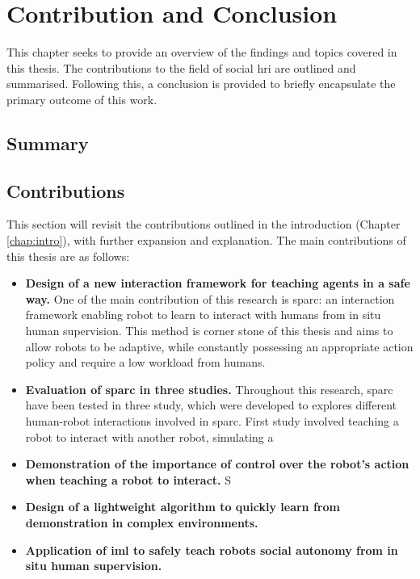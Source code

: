 \chapter{Contribution and Conclusion} \label{chap:conclusion}
This chapter seeks to provide an overview of the findings and topics covered in this thesis. The contributions to the field of social \gls{hri} are outlined and summarised. Following this, a conclusion is provided to briefly encapsulate the primary outcome of this work.

\section{Summary}\label{sec:conc_summary}

\section{Contributions}\label{sec:conc_contribution}
This section will revisit the contributions outlined in the introduction (Chapter \ref{chap:intro}), with further expansion and explanation. 
The main contributions of this thesis are as follows:
\begin{itemize}
	\item \textbf{Design of a new interaction framework for teaching agents in a safe way.} One of the main contribution of this research is \gls{sparc}: an interaction framework enabling robot to learn to interact with humans from in situ human supervision. This method is corner stone of this thesis and aims to allow robots to be adaptive, while constantly possessing an appropriate action policy and require a low workload from humans.
	
	\item \textbf{Evaluation of \gls{sparc} in three studies.} Throughout this research, \gls{sparc} have been tested in three study, which were developed to explores different human-robot interactions involved in \gls{sparc}. First study involved teaching a robot to interact with another robot, simulating a 
	
	\item \textbf{Demonstration of the importance of control over the robot's action when teaching a robot to interact.} S
	
	\item \textbf{Design of a lightweight algorithm to quickly learn from demonstration in complex environments.}
	
	\item \textbf{Application of \gls{iml} to safely teach robots social autonomy from in situ human supervision.}
\end{itemize}


